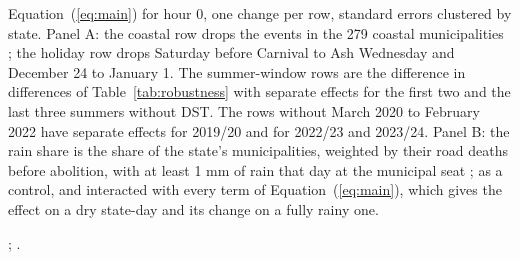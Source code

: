 \begin{table}[tbp]
  \caption{The Hour after Sunset under Other Samples}
  \label{tab:sensitivity}
  \centering\footnotesize\setlength{\tabcolsep}{5pt}
  
  \begin{tablenotes}[Notes]
  Equation~(\ref{eq:main}) for hour 0, one change per row, standard errors clustered by state. Panel A: the coastal row drops the events in the 279 coastal municipalities \citep{ibge2022defrontantes}; the holiday row drops Saturday before Carnival to Ash Wednesday and December 24 to January 1. The summer-window rows are the difference in differences of Table~\ref{tab:robustness} with separate effects for the first two and the last three summers without DST. The rows without March 2020 to February 2022 have separate effects for 2019/20 and for 2022/23 and 2023/24. Panel B: the rain share is the share of the state's municipalities, weighted by their road deaths before abolition, with at least 1 mm of rain that day at the municipal seat \citep{xavier2022new}; as a control, and interacted with every term of Equation~(\ref{eq:main}), which gives the effect on a dry state-day and its change on a fully rainy one.
  \end{tablenotes}
  \begin{tablenotes}[Sources]
  \citet{datasus2025sim}; \citet{prf2025dados}.
  \end{tablenotes}
\end{table}

